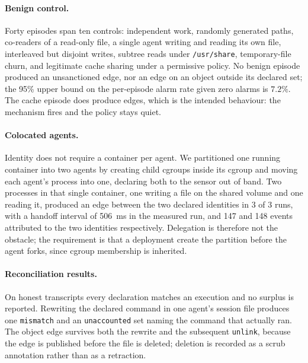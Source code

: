\paragraph{Benign control.} Forty episodes span ten controls: independent work,
randomly generated paths, co-readers of a read-only file, a single agent writing
and reading its own file, interleaved but disjoint writes, subtree reads under
\texttt{/usr/share}, temporary-file churn, and legitimate cache sharing under a
permissive policy. No benign episode produced an unsanctioned edge, nor an edge on
an object outside its declared set; the 95\% upper bound on the per-episode alarm
rate given zero alarms is $7.2\%$. The cache episode does produce edges, which is
the intended behaviour: the mechanism fires and the policy stays quiet.

\paragraph{Colocated agents.} Identity does not require a container per agent. We
partitioned one running container into two agents by creating child cgroups inside
its cgroup and moving each agent's process into one, declaring both to the sensor
out of band. Two processes in that single container, one writing a file on the
shared volume and one reading it, produced an edge between the two declared
identities in 3 of 3 runs, with a handoff interval of 506~ms in the measured run,
and 147 and 148 events attributed to the two identities respectively. Delegation
is therefore not the obstacle; the requirement is that a deployment create the
partition before the agent forks, since cgroup membership is inherited.

\paragraph{Reconciliation results.} On honest transcripts every declaration
matches an execution and no surplus is reported. Rewriting the declared command in
one agent's session file produces one \texttt{mismatch} and an \texttt{unaccounted}
set naming the command that actually ran. The object edge survives both the
rewrite and the subsequent \texttt{unlink}, because the edge is published before
the file is deleted; deletion is recorded as a scrub annotation rather than as a
retraction.

